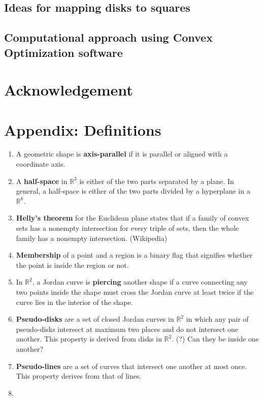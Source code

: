 \documentclass{NSF}
\begin{document}
\subsection{Ideas for mapping disks to squares}

\subsection{Computational approach using Convex Optimization software}

\section{Acknowledgement}


\section{Appendix: Definitions}
\begin{enumerate}
\item A geometric shape is \textbf{axis-parallel} if it is parallel or aligned with a coordinate axis.
\item A \textbf{half-space} in $\mathbb{R}^3$ is either of the two parts separated by a plane. In general, a half-space is either of the two parts divided by a hyperplane in a $\mathbb{R}^k$.
\item \textbf{Helly's theorem} for the Euclidean plane states that if a family of convex sets has a nonempty intersection for every triple of sets, then the whole family has a nonempty intersection. (Wikipedia)
\item \textbf{Membership} of a point and a region is a binary flag that signifies whether the point is inside the region or not.
\item In  $\mathbb{R}^2$, a Jordan curve is \textbf{piercing} another shape if a curve connecting any two points inside the shape must cross the Jordan curve at least twice if the curve lies in the interior of the shape.
\item \textbf{Pseudo-disks} are a set of closed Jordan curves in $\mathbb{R}^2$ in which any pair of pseudo-disks intersect at maximum two places and do not intersect one another. This property is derived from disks in $\mathbb{R}^2$. (?) Can they be inside one another?
\item \textbf{Pseudo-lines} are a set of curves that intersect one another at most once. This property derives from that of lines.
\item 

\end{enumerate}
\end{document}
